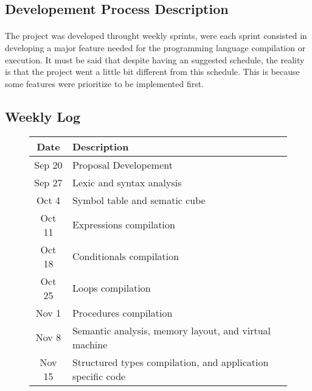 \subsection{Developement Process Description}
\paragraph{} The project was developed throught weekly sprints, were each
sprint consisted in developing a major feature needed for the programming
language compilation or execution. It must be said that despite having an
suggested schedule, the reality is that the project went a little bit different
from this schedule. This is because some features were prioritize to be
implemented first.

\subsection{Weekly Log}

\begin{figure}[h]
    \centering
    \begin{tabular}{cp{3.5in}}
        \toprule
        \textbf{Date} & \textbf{Description}\\
        \midrule Sep 20 &
        Proposal Developement\\

        \midrule Sep 27 &
        Lexic and syntax analysis\\

        \midrule Oct  4 &
        Symbol table and sematic cube\\

        \midrule Oct 11 &
        Expressions compilation\\

        \midrule Oct 18 &
        Conditionals compilation\\

        \midrule Oct 25 &
        Loops compilation\\

        \midrule Nov  1 &
        Procedures compilation\\

        \midrule Nov  8 &
        Semantic analysis, memory layout, and virtual machine\\

        \midrule Nov 15 &
        Structured types compilation, and application specific code\\

        \bottomrule
    \end{tabular}
\end{figure}

